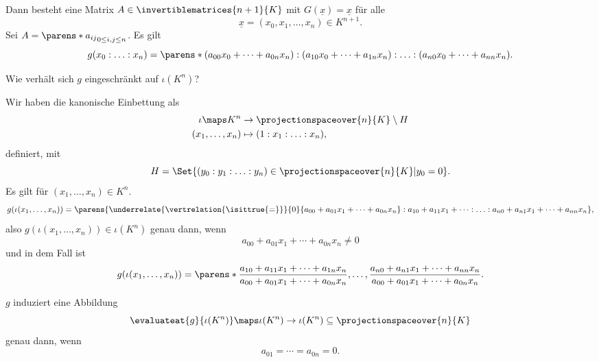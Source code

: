 Dann besteht eine Matrix \( A\in \invertiblematrices{n+1}{K} \) mit \( G(\underline{x})=\underline{x} \) für alle
\begin{equation*}
  \underline{x}=(x_0,x_1,\dotsc,x_n)\in K^{n+1}.
\end{equation*}
Sei \( A=\parens*{a_{ij}}_{0\leq i,j\leq n} \). Es gilt
\begin{equation*}
  g(x_0:\dotsc:x_n)=\parens*{(a_{00}x_0+\dotsb+a_{0n}x_n):(a_{10}x_0+\dotsb+a_{1n}x_n):\dotsc:(a_{n0}x_0+\dotsb+a_{nn}x_n)}.
\end{equation*}
\begin{frage*}
  Wie verhält sich \( g \) eingeschränkt auf \( \iota(K^n) \)? 
\end{frage*}
Wir haben die kanonische Einbettung als
\begin{equation*}
  \begin{split}
    \iota\maps K^n&\to \projectionspaceover{n}{K}\setminus H\\
    (x_1,\dotsc,x_n)&\mapsto (1:x_1:\dotsc:x_n),
  \end{split}
\end{equation*}
definiert, mit
\begin{equation*}
  H=\Set{(y_0:y_1:\dotsc:y_n)\in \projectionspaceover{n}{K}|y_0=0}.
\end{equation*}
Es gilt für \( (x_1,\dotsc,x_n)\in K^n \).
\begin{equation*}
  g(\iota(x_1,\dotsc,x_n))=\parens{\underrelate{\vertrelation{\isittrue{=}}}{0}{a_{00}+a_{01}x_1+\dotsb+a_{0n}x_n}:a_{10}+a_{11}x_1+\dotsb:\dotsc:a_{n0}+a_{n1}x_1+\dotsb+a_{nn}x_n},
\end{equation*}
also \( g(\iota(x_1,\dotsc,x_n))\in \iota(K^n) \) genau dann, wenn
\begin{equation}
  a_{00}+a_{01}x_1+\dotsb+a_{0n}x_n\neq 0
\end{equation}
und in dem Fall ist
\begin{equation*}
  g(\iota(x_1,\dotsc,x_n))=\parens*{\frac{a_{10}+a_{11}x_1+\dotsb+a_{1n}x_n}{a_{00}+a_{01}x_1+\dotsb+a_{0n}x_n},\dotsc,\frac{a_{n0}+a_{n1}x_1+\dotsb+a_{nn}x_n}{a_{00}+a_{01}x_1+\dotsb+a_{0n}x_n}}.
\end{equation*}
\begin{bemerkung*}
  \( g \) induziert eine Abbildung
  \begin{equation*}
    \evaluateat{g}{\iota(K^n)}\maps \iota(K^n)\to \iota(K^n)\subseteq \projectionspaceover{n}{K}
  \end{equation*}
  genau dann, wenn
  \begin{equation*}
    a_{01}=\dotsb=a_{0n}=0.
  \end{equation*}
\end{bemerkung*}
